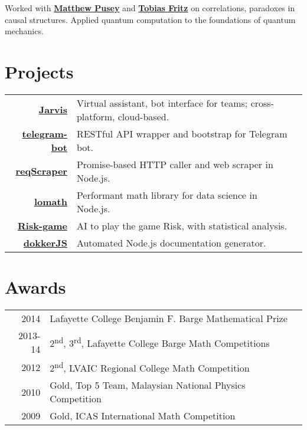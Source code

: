 \documentclass{deedy-resume-openfont}
\begin{document}
\begin{minipage}[t]{0.66\textwidth}
Worked with \textbf{\href{https://www.mattpusey.uk/}{Matthew Pusey}} and \textbf{\href{http://perimeterinstitute.ca/personal/tfritz/}{Tobias Fritz}} on correlations, paradoxes in causal structures. Applied quantum computation to the foundations of quantum mechanics.
\sectionsep


\section{Projects} 
\begin{tabular}{rll}

\href{https://github.com/kengz/jarvis}{\bf Jarvis}  & Virtual assistant, bot interface for teams; cross-platform, cloud-based.\\
\href{https://github.com/kengz/telegram-bot-bootstrap}{\bf telegram-bot} &  RESTful API wrapper and bootstrap for Telegram bot. \\
\href{https://github.com/kengz/reqscraper}{\bf reqScraper}  &  Promise-based HTTP caller and web scraper in Node.js. \\
\href{https://github.com/kengz/lomath}{\bf lomath}  & Performant math library for data science in Node.js.\\
\href{https://github.com/kengz/Risk-game}{\bf Risk-game} & AI to play the game Risk, with statistical analysis. \\
\href{https://github.com/kengz/dokker}{\bf dokkerJS}  &  Automated Node.js documentation generator. \\
\end{tabular}
\sectionsep


\section{Awards} 
\begin{tabular}{rll}
2014	     & Lafayette College Benjamin F. Barge Mathematical Prize\\
2013-14	     & 2\textsuperscript{nd}, 3\textsuperscript{rd}, Lafayette College Barge Math Competitions\\
2012	     & 2\textsuperscript{nd}, LVAIC Regional College Math Competition\\
2010     & Gold, Top 5 Team, Malaysian National Physics Competition  \\
2009     & Gold, ICAS International Math Competition \\
\end{tabular}
\sectionsep



\end{minipage}
\end{document}
